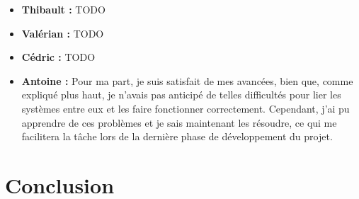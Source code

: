 \documentclass[12pt]{report}
\begin{document}
\begin{itemize}
	\item \textbf{Thibault :} TODO
        \item \textbf{Valérian :} TODO
	\item \textbf{Cédric :} TODO
    \item \textbf{Antoine :} Pour ma part, je suis satisfait de mes avancées,
    bien que, comme expliqué plus haut, je n'avais pas anticipé de telles
    difficultés pour lier les systèmes entre eux et les faire fonctionner
    correctement. Cependant, j'ai pu apprendre de ces problèmes et je sais
    maintenant les résoudre, ce qui me facilitera la tâche lors de la dernière
    phase de développement du projet.
\end{itemize}

\chapter{Conclusion}
\end{document}
